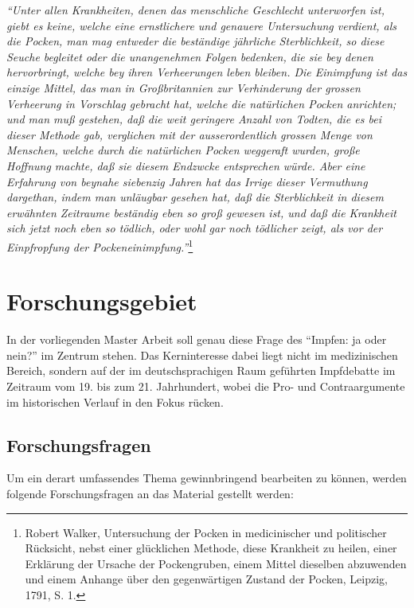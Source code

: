 \documentclass[
    a4paper,
    12pt,
    hyphens,
    chapterprefix=true,
    headheight=33pt,
    footheight=29pt,
    headings=optiontohead, %
]{scrartcl}
\begin{document}
\begin{center}
\textit{"`Unter allen Krankheiten, denen das menschliche Geschlecht unterworfen ist, giebt es keine, welche eine ernstlichere und genauere Untersuchung verdient, als die Pocken, man mag entweder die beständige jährliche Sterblichkeit, so diese Seuche begleitet oder die unangenehmen Folgen bedenken, die sie bey denen hervorbringt, welche bey ihren Verheerungen leben bleiben. Die Einimpfung ist das einzige Mittel, das man in Großbritannien zur Verhinderung der grossen Verheerung in Vorschlag gebracht hat, welche die natürlichen Pocken anrichten; und man muß gestehen, daß die weit geringere Anzahl von Todten, die es bei dieser Methode gab, verglichen mit der ausserordentlich grossen Menge von Menschen, welche durch die natürlichen Pocken weggeraft wurden, große Hoffnung machte, daß sie diesem Endzwcke entsprechen würde. Aber eine Erfahrung von beynahe siebenzig Jahren hat das Irrige dieser Vermuthung dargethan, indem man unläugbar gesehen hat, daß die Sterblichkeit in diesem erwähnten Zeitraume beständig eben so groß gewesen ist, und daß die Krankheit sich jetzt noch eben so tödlich, oder wohl gar noch tödlicher zeigt, als vor der Einpfropfung der Pockeneinimpfung."'}\footnote{Robert Walker, Untersuchung der Pocken in medicinischer und politischer Rücksicht, nebst einer glücklichen Methode, diese Krankheit zu heilen, einer Erklärung der Ursache der Pockengruben, einem Mittel dieselben abzuwenden und einem Anhange über den gegenwärtigen Zustand der Pocken, Leipzig, 1791, S. 1.}
\end{center}


\section{Forschungsgebiet}

In der vorliegenden Master Arbeit soll genau diese Frage des "`Impfen: ja oder nein?"' im Zentrum stehen. Das Kerninteresse dabei liegt nicht im medizinischen Bereich, sondern auf der im deutschsprachigen Raum geführten Impfdebatte im Zeitraum vom 19. bis zum 21. Jahrhundert, wobei die Pro- und Contraargumente im historischen Verlauf in den Fokus rücken.

\subsection{Forschungsfragen}
Um ein derart umfassendes Thema gewinnbringend bearbeiten zu können, werden folgende Forschungsfragen an das Material gestellt werden:
\end{document}
